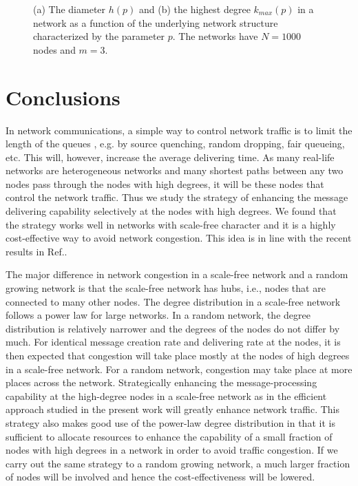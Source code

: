 \documentclass[aps,prl,twocolumn,superscriptaddress,showpacs]{revtex4}
\begin{document}
\begin{figure}
\begin{center}
 \caption{(a) The
diameter $h(p)$ and (b) the highest degree $k_{max}(p)$ in a
network as a function of the underlying network structure
characterized by the parameter $p$.  The networks have $N=1000$
nodes and $m=3$.} \label{fig5}
\end{center}
\end{figure}

\section{Conclusions}
In network communications, a simple way to control network traffic
is to limit the length of the queues \cite{Csa:1994}, e.g. by
source quenching, random dropping, fair queueing, etc.  This will,
however, increase the average delivering time.  As many real-life
networks are heterogeneous networks and many shortest paths
between any two nodes pass through the nodes with high degrees, it
will be these nodes that control the network traffic.  Thus we
study the strategy of enhancing the message delivering capability
selectively at the nodes with high degrees.  We found that the
strategy works well in networks with scale-free character and it
is a highly cost-effective way to avoid network congestion. This
idea is in line with the recent results in
Ref.\cite{Adilson:2004,Zoltan:2004}.

The major difference in network congestion in a scale-free network
and a random growing network is that the scale-free network has
hubs, i.e., nodes that are connected to many other nodes.  The
degree distribution in a scale-free network follows a power law
for large networks.  In a random network, the degree distribution
is relatively narrower and the degrees of the nodes do not differ
by much.  For identical message creation rate and delivering rate
at the nodes, it is then expected that congestion will take place
mostly at the nodes of high degrees in a scale-free network.  For
a random network, congestion may take place at more places across
the network.  Strategically enhancing the message-processing
capability at the high-degree nodes in a scale-free network as in
the efficient approach studied in the present work will greatly
enhance network traffic.  This strategy also makes good use of the
power-law degree distribution in that it is sufficient to allocate
resources to enhance the capability of a small fraction of nodes
with high degrees in a network in order to avoid traffic
congestion.  If we carry out the same strategy to a random growing
network, a much larger fraction of nodes will be involved and
hence the cost-effectiveness will be lowered.
\end{document}

